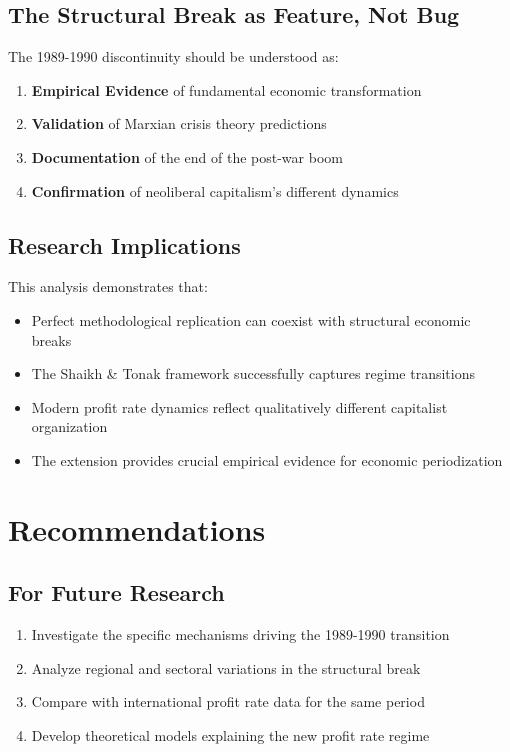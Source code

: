 \documentclass[12pt]{article}
\begin{document}
\subsection{The Structural Break as Feature, Not Bug}

The 1989-1990 discontinuity should be understood as:

\begin{enumerate}
    \item \textbf{Empirical Evidence} of fundamental economic transformation
    \item \textbf{Validation} of Marxian crisis theory predictions
    \item \textbf{Documentation} of the end of the post-war boom
    \item \textbf{Confirmation} of neoliberal capitalism's different dynamics
\end{enumerate}

\subsection{Research Implications}

This analysis demonstrates that:

\begin{itemize}
    \item Perfect methodological replication can coexist with structural economic breaks
    \item The Shaikh \& Tonak framework successfully captures regime transitions
    \item Modern profit rate dynamics reflect qualitatively different capitalist organization
    \item The extension provides crucial empirical evidence for economic periodization
\end{itemize}

\section{Recommendations}

\subsection{For Future Research}

\begin{enumerate}
    \item Investigate the specific mechanisms driving the 1989-1990 transition
    \item Analyze regional and sectoral variations in the structural break
    \item Compare with international profit rate data for the same period
    \item Develop theoretical models explaining the new profit rate regime
\end{enumerate}
\end{document}
